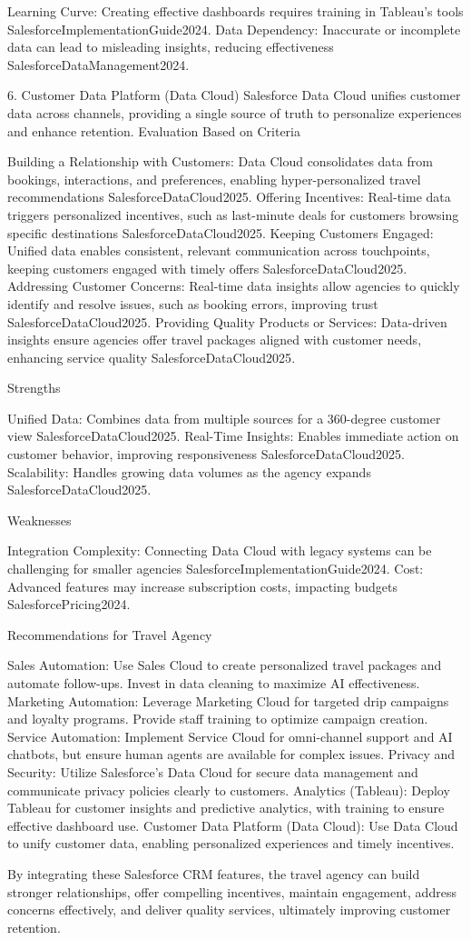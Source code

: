 Learning Curve: Creating effective dashboards requires training in Tableau’s tools {SalesforceImplementationGuide2024}.
Data Dependency: Inaccurate or incomplete data can lead to misleading insights, reducing effectiveness {SalesforceDataManagement2024}.

6. Customer Data Platform (Data Cloud)
Salesforce Data Cloud unifies customer data across channels, providing a single source of truth to personalize experiences and enhance retention.
Evaluation Based on Criteria

Building a Relationship with Customers: Data Cloud consolidates data from bookings, interactions, and preferences, enabling hyper-personalized travel recommendations {SalesforceDataCloud2025}.
Offering Incentives: Real-time data triggers personalized incentives, such as last-minute deals for customers browsing specific destinations {SalesforceDataCloud2025}.
Keeping Customers Engaged: Unified data enables consistent, relevant communication across touchpoints, keeping customers engaged with timely offers {SalesforceDataCloud2025}.
Addressing Customer Concerns: Real-time data insights allow agencies to quickly identify and resolve issues, such as booking errors, improving trust {SalesforceDataCloud2025}.
Providing Quality Products or Services: Data-driven insights ensure agencies offer travel packages aligned with customer needs, enhancing service quality {SalesforceDataCloud2025}.

Strengths

Unified Data: Combines data from multiple sources for a 360-degree customer view {SalesforceDataCloud2025}.
Real-Time Insights: Enables immediate action on customer behavior, improving responsiveness {SalesforceDataCloud2025}.
Scalability: Handles growing data volumes as the agency expands {SalesforceDataCloud2025}.

Weaknesses

Integration Complexity: Connecting Data Cloud with legacy systems can be challenging for smaller agencies {SalesforceImplementationGuide2024}.
Cost: Advanced features may increase subscription costs, impacting budgets {SalesforcePricing2024}.

Recommendations for Travel Agency

Sales Automation: Use Sales Cloud to create personalized travel packages and automate follow-ups. Invest in data cleaning to maximize AI effectiveness.
Marketing Automation: Leverage Marketing Cloud for targeted drip campaigns and loyalty programs. Provide staff training to optimize campaign creation.
Service Automation: Implement Service Cloud for omni-channel support and AI chatbots, but ensure human agents are available for complex issues.
Privacy and Security: Utilize Salesforce’s Data Cloud for secure data management and communicate privacy policies clearly to customers.
Analytics (Tableau): Deploy Tableau for customer insights and predictive analytics, with training to ensure effective dashboard use.
Customer Data Platform (Data Cloud): Use Data Cloud to unify customer data, enabling personalized experiences and timely incentives.

By integrating these Salesforce CRM features, the travel agency can build stronger relationships, offer compelling incentives, maintain engagement, address concerns effectively, and deliver quality services, ultimately improving customer retention.
